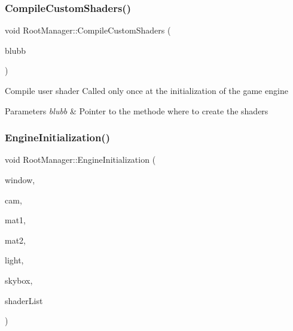 \subsubsection{\texorpdfstring{CompileCustomShaders()}{CompileCustomShaders()}}
{\footnotesize\ttfamily void Root\+Manager\+::\+Compile\+Custom\+Shaders (\begin{DoxyParamCaption}\item[{void $\ast$}]{blubb }\end{DoxyParamCaption})}

Compile user shader Called only once at the initialization of the game engine 
\begin{DoxyParams}{Parameters}
{\em blubb} & Pointer to the methode where to create the shaders \\
\hline
\end{DoxyParams}
\mbox{\label{class_root_manager_aaeadd95892c6fa7eb1e909662ee346e8}} 
\subsubsection{\texorpdfstring{EngineInitialization()}{EngineInitialization()}}
{\footnotesize\ttfamily void Root\+Manager\+::\+Engine\+Initialization (\begin{DoxyParamCaption}\item[{\mbox{\hyperlink{class_window}{Window}} \&}]{window,  }\item[{\mbox{\hyperlink{class_camera}{Camera}} \&}]{cam,  }\item[{\mbox{\hyperlink{class_material}{Material}} \&}]{mat1,  }\item[{\mbox{\hyperlink{class_material}{Material}} \&}]{mat2,  }\item[{\mbox{\hyperlink{class_directional_light}{Directional\+Light}} \&}]{light,  }\item[{\mbox{\hyperlink{class_skybox}{Skybox}} \&}]{skybox,  }\item[{std\+::vector$<$ \mbox{\hyperlink{class_shader}{Shader}} $>$ \&}]{shader\+List }\end{DoxyParamCaption})}


